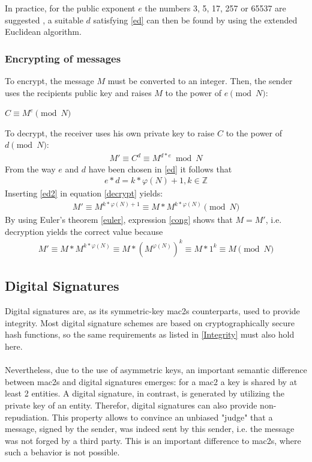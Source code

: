 In practice, for the public exponent $e$ the numbers 3, 5, 17, 257 or 65537 are suggested \cite{891000}, a suitable $d$ satisfying \ref{ed} can then be found
by using the extended Euclidean algorithm.

\subsubsection{Encrypting of messages}

To encrypt, the message $M$ must be converted to an integer. Then, the sender uses the recipients public key and raises $M$ to the power of $e \pmod N$:
\begin{center}
 $C \equiv M^e \pmod N$
\end{center}
To decrypt, the receiver uses his own private key to raise $C$ to the power of $d \pmod N$:
\begin{align}\label{decrypt}
 M' \equiv C^d \equiv M^{d*e} \bmod N
\end{align}
From the way $e$ and $d$ have been chosen in \ref{ed} it follows that 
\begin{align}\label{ed2}
 e*d = k * \varphi(N) + 1, k \in \mathbb{Z} 
\end{align}
Inserting \ref{ed2} in equation \ref{decrypt} yields:
\begin{align}\label{cong}
  M' \equiv M^{k * \varphi(N) + 1} \equiv M* M^{k * \varphi(N)} \pmod N
\end{align}
By using Euler's theorem \ref{euler}, expression \ref{cong} shows that $M=M'$, i.e. decryption yields the correct value because
\begin{align*}
 M' \equiv M* M^{k * \varphi(N)} \equiv M* (M^{ \varphi(N)})^k \equiv M * 1^k \equiv M \pmod N
\end{align*} 

\subsection{Digital Signatures}\label{digitalSignatures}

Digital signatures are, as its symmetric-key \glspl{mac2} counterparts, used to provide integrity. Most digital signature schemes are based on
cryptographically secure hash functions, so the same requirements as listed in \ref{Integrity} must also hold here.
\\
\\
Nevertheless, due to the use of asymmetric keys, an important semantic difference between \glspl{mac2} and digital signatures emerges: for a \gls{mac2} 
a key is shared by at least 2 entities. A digital signature, in contrast, is generated by utilizing the private key of an entity. Therefor,
digital signatures can also provide non-repudiation.
This property allows to convince an unbiased "judge" that a message, signed by the sender, was indeed sent by this sender, i.e. the message was not
forged by a third party. This is an important difference to \glspl{mac2}, where such a behavior is not possible.

